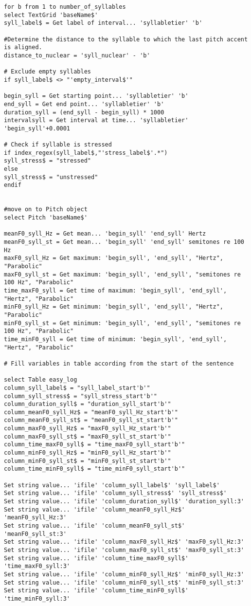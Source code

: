 \begin{Verbatim}[fontsize=\tiny]
for b from 1 to number_of_syllables
select TextGrid 'baseName$'
syll_label$ = Get label of interval... 'syllabletier' 'b'

#Determine the distance to the syllable to which the last pitch accent is aligned.
distance_to_nuclear = 'syll_nuclear' - 'b' 

# Exclude empty syllables
if syll_label$ <> "'empty_interval$'"

begin_syll = Get starting point... 'syllabletier' 'b'
end_syll = Get end point... 'syllabletier' 'b'
duration_syll = (end_syll - begin_syll) * 1000
intervalsyll = Get interval at time... 'syllabletier' 'begin_syll'+0.0001

# Check if syllable is stressed
if index_regex(syll_label$,"'stress_label$'.*")
syll_stress$ = "stressed"
else
syll_stress$ = "unstressed"
endif


#move on to Pitch object
select Pitch 'baseName$'

meanF0_syll_Hz = Get mean... 'begin_syll' 'end_syll' Hertz
meanF0_syll_st = Get mean... 'begin_syll' 'end_syll' semitones re 100 Hz
maxF0_syll_Hz = Get maximum: 'begin_syll', 'end_syll', "Hertz", "Parabolic"
maxF0_syll_st = Get maximum: 'begin_syll', 'end_syll', "semitones re 100 Hz", "Parabolic"
time_maxF0_syll = Get time of maximum: 'begin_syll', 'end_syll', "Hertz", "Parabolic"
minF0_syll_Hz = Get minimum: 'begin_syll', 'end_syll', "Hertz", "Parabolic"
minF0_syll_st = Get minimum: 'begin_syll', 'end_syll', "semitones re 100 Hz", "Parabolic"
time_minF0_syll = Get time of minimum: 'begin_syll', 'end_syll', "Hertz", "Parabolic"

# Fill variables in table according from the start of the sentence

select Table easy_log
column_syll_label$ = "syll_label_start'b'"
column_syll_stress$ = "syll_stress_start'b'"
column_duration_syll$ = "duration_syll_start'b'"
column_meanF0_syll_Hz$ = "meanF0_syll_Hz_start'b'"
column_meanF0_syll_st$ = "meanF0_syll_st_start'b'"
column_maxF0_syll_Hz$ = "maxF0_syll_Hz_start'b'"
column_maxF0_syll_st$ = "maxF0_syll_st_start'b'"
column_time_maxF0_syll$ = "time_maxF0_syll_start'b'"
column_minF0_syll_Hz$ = "minF0_syll_Hz_start'b'"
column_minF0_syll_st$ = "minF0_syll_st_start'b'"
column_time_minF0_syll$ = "time_minF0_syll_start'b'"

Set string value... 'ifile' 'column_syll_label$' 'syll_label$'
Set string value... 'ifile' 'column_syll_stress$' 'syll_stress$'
Set string value... 'ifile' 'column_duration_syll$' 'duration_syll:3'
Set string value... 'ifile' 'column_meanF0_syll_Hz$' 'meanF0_syll_Hz:3'
Set string value... 'ifile' 'column_meanF0_syll_st$' 'meanF0_syll_st:3'
Set string value... 'ifile' 'column_maxF0_syll_Hz$' 'maxF0_syll_Hz:3'
Set string value... 'ifile' 'column_maxF0_syll_st$' 'maxF0_syll_st:3'
Set string value... 'ifile' 'column_time_maxF0_syll$' 'time_maxF0_syll:3'
Set string value... 'ifile' 'column_minF0_syll_Hz$' 'minF0_syll_Hz:3'
Set string value... 'ifile' 'column_minF0_syll_st$' 'minF0_syll_st:3'
Set string value... 'ifile' 'column_time_minF0_syll$' 'time_minF0_syll:3'


\end{Verbatim}
